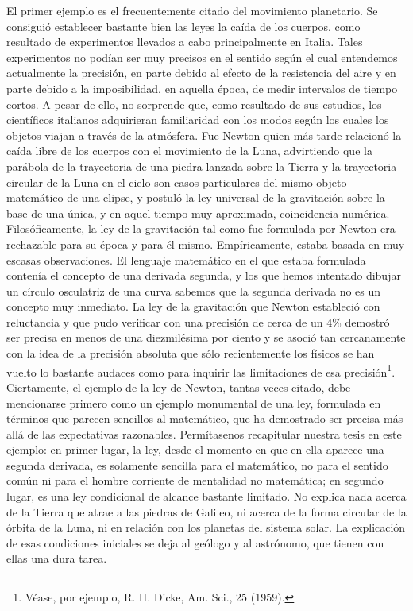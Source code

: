 \documentclass[a4paper, 12pt]{article}
\begin{document}
El primer ejemplo es el frecuentemente citado del movimiento planetario. Se consiguió establecer bastante bien las leyes la caída de los cuerpos, como resultado de experimentos llevados a cabo principalmente en Italia. Tales experimentos no podían ser muy precisos en el sentido según el cual entendemos actualmente la precisión, en parte debido al efecto de la resistencia del aire y en parte debido a la imposibilidad, en aquella época, de medir intervalos de tiempo cortos. A pesar de ello, no sorprende que, como resultado de sus estudios, los científicos italianos adquirieran familiaridad con los modos según los cuales los objetos viajan a través de la atmósfera. Fue Newton quien más tarde relacionó la caída libre de los cuerpos con el movimiento de la Luna, advirtiendo que la parábola de la trayectoria de una piedra lanzada sobre la Tierra y la trayectoria circular de la Luna en el cielo son casos particulares del mismo objeto matemático de una elipse, y postuló la ley universal de la gravitación sobre la base de una única, y en aquel tiempo muy aproximada, coincidencia numérica. Filosóficamente, la ley de la gravitación tal como fue formulada por Newton era rechazable para su época y para él mismo. Empíricamente, estaba basada en muy escasas observaciones. El lenguaje matemático en el que estaba formulada contenía el concepto de una derivada segunda, y los que hemos intentado dibujar un círculo osculatriz de una curva sabemos que la segunda derivada no es un concepto muy inmediato. La ley de la gravitación que Newton estableció con reluctancia y que pudo verificar con una precisión de cerca de un 4\% demostró ser precisa en menos de una diezmilésima por ciento y se asoció tan cercanamente con la idea de la precisión absoluta que sólo recientemente los físicos se han vuelto lo bastante audaces como para inquirir las limitaciones de esa precisión\footnote{Véase, por ejemplo, R. H. Dicke, Am. Sci., 25 (1959).}. Ciertamente, el ejemplo de la ley de Newton, tantas veces citado, debe mencionarse primero como un ejemplo monumental de una ley, formulada en términos que parecen sencillos al matemático, que ha demostrado ser precisa más allá de las expectativas razonables. Permítasenos recapitular nuestra tesis en este ejemplo: en primer lugar, la ley, desde el momento en que en ella aparece una segunda derivada, es solamente sencilla para el matemático, no para el sentido común ni para el hombre corriente de mentalidad no matemática; en segundo lugar, es una ley condicional de alcance bastante limitado. No explica nada acerca de la Tierra que atrae a las piedras de Galileo, ni acerca de la forma circular de la órbita de la Luna, ni en relación con los planetas del sistema solar. La explicación de esas condiciones iniciales se deja al geólogo y al astrónomo, que tienen con ellas una dura tarea.
\end{document}
